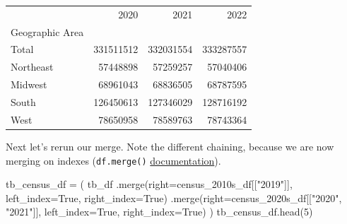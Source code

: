 \documentclass[
  letterpaper,
  DIV=11,
  numbers=noendperiod]{scrreprt}
\newenvironment{Shaded}{\begin{snugshade}}{\end{snugshade}}
\newcommand{\DecValTok}[1]{\textcolor[rgb]{0.68,0.00,0.00}{#1}}
\newcommand{\NormalTok}[1]{\textcolor[rgb]{0.00,0.23,0.31}{#1}}
\newcommand{\OperatorTok}[1]{\textcolor[rgb]{0.37,0.37,0.37}{#1}}
\newcommand{\StringTok}[1]{\textcolor[rgb]{0.13,0.47,0.30}{#1}}
\newcommand{\VariableTok}[1]{\textcolor[rgb]{0.07,0.07,0.07}{#1}}
\begin{document}
\begin{tabular}{lrrr}
\toprule
{} &       2020 &       2021 &       2022 \\
Geographic Area &            &            &            \\
\midrule
Total           &  331511512 &  332031554 &  333287557 \\
Northeast       &   57448898 &   57259257 &   57040406 \\
Midwest         &   68961043 &   68836505 &   68787595 \\
South           &  126450613 &  127346029 &  128716192 \\
West            &   78650958 &   78589763 &   78743364 \\
\bottomrule
\end{tabular}

Next let's rerun our merge. Note the different chaining, because we are
now merging on indexes (\texttt{df.merge()}
\href{https://pandas.pydata.org/docs/reference/api/pandas.DataFrame.merge.html}{documentation}).

\begin{Shaded}
\begin{Highlighting}[]
\NormalTok{tb\_census\_df }\OperatorTok{=}\NormalTok{ (}
\NormalTok{    tb\_df}
\NormalTok{    .merge(right}\OperatorTok{=}\NormalTok{census\_2010s\_df[[}\StringTok{"2019"}\NormalTok{]],}
\NormalTok{           left\_index}\OperatorTok{=}\VariableTok{True}\NormalTok{, right\_index}\OperatorTok{=}\VariableTok{True}\NormalTok{)}
\NormalTok{    .merge(right}\OperatorTok{=}\NormalTok{census\_2020s\_df[[}\StringTok{"2020"}\NormalTok{, }\StringTok{"2021"}\NormalTok{]],}
\NormalTok{           left\_index}\OperatorTok{=}\VariableTok{True}\NormalTok{, right\_index}\OperatorTok{=}\VariableTok{True}\NormalTok{)}
\NormalTok{)}
\NormalTok{tb\_census\_df.head(}\DecValTok{5}\NormalTok{)}
\end{Highlighting}
\end{Shaded}
\end{document}
